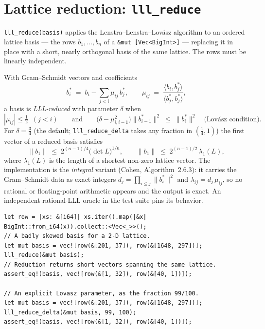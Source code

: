 \documentclass[11pt]{article}
\newcommand{\code}[1]{\texttt{#1}}
\begin{document}
\section{Lattice reduction: \code{lll\_reduce}}
\label{sec:lll}

\code{lll\_reduce(basis)} applies the Lenstra--Lenstra--Lov\'asz algorithm
to an ordered lattice basis --- the rows $b_1, \ldots, b_n$ of a
\code{\&mut [Vec<BigInt>]} --- replacing it in place with a short, nearly
orthogonal basis of the same lattice. The rows must be linearly
independent.

With Gram--Schmidt vectors and coefficients
\begin{equation}
b_i^{*} \;=\; b_i - \sum_{j < i} \mu_{ij}\, b_j^{*},
\qquad
\mu_{ij} \;=\; \frac{\langle b_i, b_j^{*} \rangle}
                    {\langle b_j^{*}, b_j^{*} \rangle},
\end{equation}
a basis is \emph{LLL-reduced} with parameter $\delta$ when
\begin{equation}
|\mu_{ij}| \le \tfrac12 \;\; (j < i)
\qquad\text{and}\qquad
\bigl(\delta - \mu_{i,i-1}^2\bigr) \lVert b_{i-1}^{*} \rVert^2
\;\le\; \lVert b_i^{*} \rVert^2
\quad\text{(Lov\'asz condition)}.
\end{equation}
For $\delta = \tfrac34$ (the default; \code{lll\_reduce\_delta} takes any
fraction in $(\tfrac14, 1)$) the first vector of a reduced basis satisfies
\begin{equation}
\lVert b_1 \rVert \;\le\; 2^{(n-1)/4} \bigl(\det L\bigr)^{1/n},
\qquad
\lVert b_1 \rVert \;\le\; 2^{(n-1)/2}\, \lambda_1(L),
\end{equation}
where $\lambda_1(L)$ is the length of a shortest non-zero lattice vector.
The implementation is the \emph{integral} variant (Cohen,
Algorithm~2.6.3): it carries the Gram--Schmidt data as exact integers
$d_j = \prod_{i \le j} \lVert b_i^* \rVert^2$ and
$\lambda_{ij} = d_j\,\mu_{ij}$, so no rational or floating-point
arithmetic appears and the output is exact. An independent rational-LLL
oracle in the test suite pins its behavior.

\begin{lstlisting}
let row = |xs: &[i64]| xs.iter().map(|&x| BigInt::from_i64(x)).collect::<Vec<_>>();
// A badly skewed basis for a 2-D lattice.
let mut basis = vec![row(&[201, 37]), row(&[1648, 297])];
lll_reduce(&mut basis);
// Reduction returns short vectors spanning the same lattice.
assert_eq!(basis, vec![row(&[1, 32]), row(&[40, 1])]);

// An explicit Lovasz parameter, as the fraction 99/100.
let mut basis = vec![row(&[201, 37]), row(&[1648, 297])];
lll_reduce_delta(&mut basis, 99, 100);
assert_eq!(basis, vec![row(&[1, 32]), row(&[40, 1])]);
\end{lstlisting}
\end{document}

